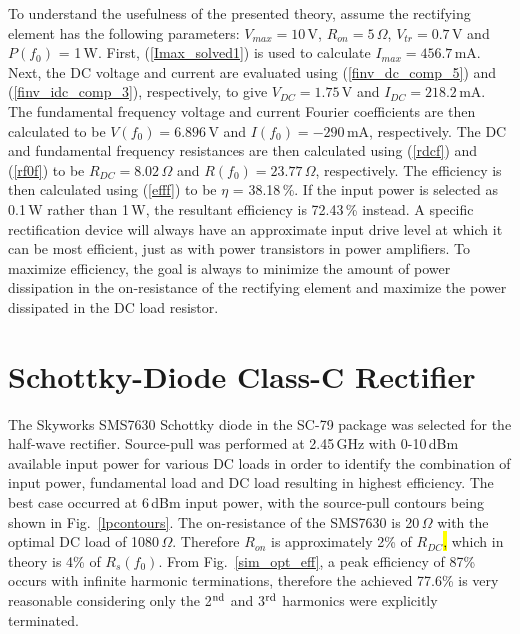 \documentclass[journal]{IEEEtran}
\begin{document}
To understand the usefulness of the presented theory, assume the rectifying element has the following parameters: $V_{max} = 10$\,V, $R_{on} = 5$\,$\Omega$, $V_{tr} = 0.7$\,V and $P(f_0)$ = 1\,W.  First, (\ref{Imax_solved1}) is used to calculate $I_{max}=456.7$\,mA. Next, the DC voltage and current are evaluated using (\ref{finv_dc_comp_5}) and (\ref{finv_idc_comp_3}), respectively, to give $V_{DC}=1.75$\,V and $I_{DC}=218.2$\,mA. The fundamental frequency voltage and current Fourier coefficients are then calculated to be $V(f_0)=6.896$\,V and $I(f_0)=-290$\,mA, respectively.  The DC and fundamental frequency resistances are then calculated using (\ref{rdcf}) and (\ref{rf0f}) to be $R_{DC}=8.02$\,$\Omega$ and $R(f_0)=23.77$\,$\Omega$, respectively.  The efficiency is then calculated using (\ref{efff}) to be $\eta$ = 38.18\,\%. If the input power is selected as 0.1\,W rather than 1\,W, the resultant efficiency is 72.43\,\% instead.  A specific rectification device will always have an approximate input drive level at which it can be most efficient, just as with power transistors in power amplifiers. To maximize efficiency, the goal is always to minimize the amount of power dissipation in the on-resistance of the rectifying element and maximize the power dissipated in the DC load resistor.









\section{Schottky-Diode Class-C Rectifier}

The Skyworks SMS7630 Schottky diode in the SC-79 package was selected for the half-wave rectifier. Source-pull was performed at 2.45\,GHz with 0-10\,dBm available input power for various DC loads in order to identify the combination of input power, fundamental load and DC load resulting in highest efficiency.  The best case occurred at 6\,dBm input power, with the source-pull contours being shown in Fig.~\ref{lpcontours}.  The on-resistance of the SMS7630 is 20\,$\Omega$ with the optimal DC load of 1080\,$\Omega$. Therefore $R_{on}$ is approximately 2\% of $R_{DC}$\hl{,} which in theory is 4\% of $R_s(f_0)$.  From Fig.~\ref{sim_opt_eff}, a peak efficiency of 87\% occurs with infinite harmonic terminations, therefore the achieved 77.6\% is very reasonable considering only the 2$^{\rm nd}$ and 3$^{\rm rd}$ harmonics were explicitly terminated.
\end{document}

